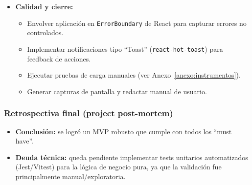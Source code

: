 \begin{itemize}
\item \textbf{Calidad y cierre:}
\begin{itemize}
\item [Frontend] Envolver aplicación en \texttt{ErrorBoundary} de React para capturar errores no controlados.
\item [Frontend] Implementar notificaciones tipo \enquote{Toast} (\texttt{react-hot-toast}) para feedback de acciones.
\item [Testing] Ejecutar pruebas de carga manuales (ver Anexo~\ref{anexo:instrumentos}).
\item [Product Owner] Generar capturas de pantalla y redactar manual de usuario.
\end{itemize}
\end{itemize}

\subsubsection{Retrospectiva final (project post-mortem)}
\begin{itemize}
\item \textbf{Conclusión:} se logró un MVP robusto que cumple con todos los \enquote{must have}.
\item \textbf{Deuda técnica:} queda pendiente implementar tests unitarios automatizados (Jest/Vitest) para la lógica de negocio pura, ya que la validación fue principalmente manual/exploratoria.
\end{itemize}
